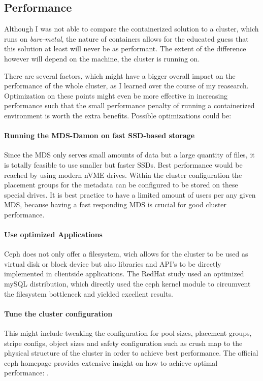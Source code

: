 \documentclass[titlepage, a4paper, 11pt]{scrartcl}
\begin{document}
        \subsection{Performance}\label{performance:tuning}

            Although I was not able to compare the containerized solution to a cluster, which runs on \textit{bare-metal}, 
            the nature of containers allows for the educated guess that this solution at least will never be as performant. The extent of the difference however will depend on the machine, the cluster is running on. 

            There are several factors, which might have a bigger overall impact on the performance of the whole cluster, as I learned over the course of my reasearch. Optimization on these points might even be more effective in increasing performance such that the small performance penalty of running a containerized environment is worth the extra benefits. Possible optimizations could be:

            \paragraph{Running the MDS-Damon on fast SSD-based storage} Since the MDS only serves small amounts of data but a large quantity of files, it is totally feasible to use smaller but faster SSDs. Best performance would be reached by using modern nVME drives. Within the cluster configuration the placement groups for the metadata can be configured to be stored on these special drives. It is best practice to have a limited amount of users per any given MDS, because having a fast responding MDS is crucial for good cluster performance.

            \paragraph{Use optimized Applications} Ceph does not only offer a filesystem, wich allows for the cluster to be used as virtual disk or block device but also libraries and API's to be directly implemented in clientside applications. The RedHat study\cite{redhatstudy} used an optimized mySQL distribution, which directly used the ceph kernel module to circumvent the filesystem bottleneck and yielded excellent results.

            \paragraph{Tune the cluster configuration} This might include tweaking the configuration for pool sizes, placement groups, stripe configs, object sizes and safety configuration such as crush map to the physical structure of the cluster in order to achieve best performance. The official ceph homepage provides extensive insight on how to achieve optimal performance: \cite{CephMakingCephFaster}.
\end{document}
